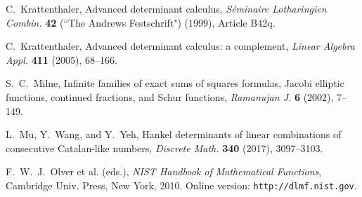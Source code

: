 \documentclass{amsart}
\theoremstyle{plain}
\numberwithin{equation}{section}
\begin{document}
\begin{thebibliography}{25}
 C.~Krattenthaler, Advanced determinant calculus,
{\it S\'eminaire Lotharingien Combin.} {\bf 42} (``The Andrews Festschrift")
(1999), Article B42q. 

 C.~Krattenthaler, Advanced determinant calculus: a complement, 
{\it Linear Algebra Appl.} {\bf 411} (2005), 68--166. 

 S.~C.~Milne, Infinite families of exact sums of squares formulas, 
Jacobi elliptic functions, continued fractions, and Schur functions,
{\it  Ramanujan J.} {\bf 6} (2002), 7--149. 

 L.~Mu, Y.~Wang, and Y.~Yeh, Hankel determinants of linear 
combinations of consecutive Catalan-like numbers, {\it Discrete Math.} 
{\bf 340} (2017), 3097--3103.

 F.~W.~J.~Olver et al. (eds.), {\it NIST Handbook of Mathematical
Functions\/}, Cambridge Univ. Press, New York, 2010. Online version:
{\tt  http://dlmf.nist.gov}.

\end{thebibliography}
\end{document}
